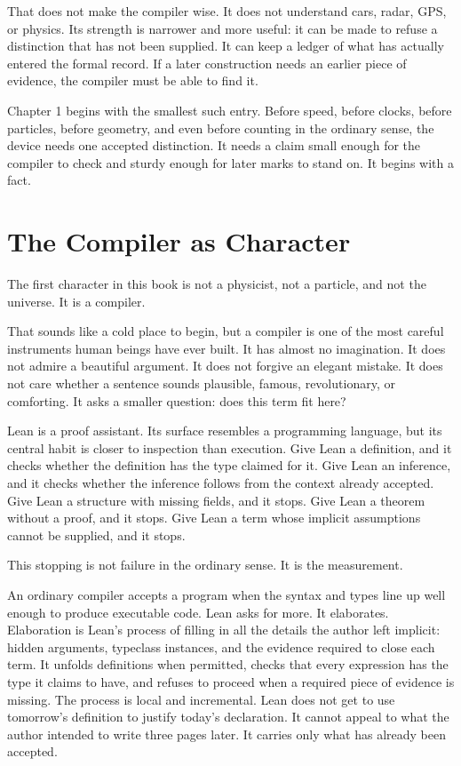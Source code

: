 That does not make the compiler wise. It does not understand cars, radar, GPS,
or physics. Its strength is narrower and more useful: it can be made to refuse
a distinction that has not been supplied. It can keep a ledger of what has
actually entered the formal record. If a later construction needs an earlier
piece of evidence, the compiler must be able to find it.

Chapter 1 begins with the smallest such entry. Before speed, before clocks,
before particles, before geometry, and even before counting in the ordinary
sense, the device needs one accepted distinction. It needs a claim small enough
for the compiler to check and sturdy enough for later marks to stand on. It
begins with a fact.


\section{The Compiler as Character}
\label{se:compiler-as-character}

The first character in this book is not a physicist, not a particle, and not
the universe. It is a compiler.

That sounds like a cold place to begin, but a compiler is one of the most
careful instruments human beings have ever built. It has almost no imagination.
It does not admire a beautiful argument. It does not forgive an elegant mistake.
It does not care whether a sentence sounds plausible, famous, revolutionary, or
comforting. It asks a smaller question: does this term fit here?

Lean is a proof assistant. Its surface resembles a programming language, but
its central habit is closer to inspection than execution. Give Lean a
definition, and it checks whether the definition has the type claimed for it.
Give Lean an inference, and it checks whether the inference follows from the
context already accepted. Give Lean a structure with missing fields, and it
stops. Give Lean a theorem without a proof, and it stops. Give Lean a term whose
implicit assumptions cannot be supplied, and it stops.

This stopping is not failure in the ordinary sense. It is the measurement.

An ordinary compiler accepts a program when the syntax and types line up well
enough to produce executable code. Lean asks for more. It elaborates.
Elaboration is Lean's process of filling in all the details the author left
implicit: hidden arguments, typeclass instances, and the evidence required to
close each term. It unfolds definitions when permitted, checks that every
expression has the type it claims to have, and refuses to proceed when a
required piece of evidence is missing. The process is local and incremental.
Lean does not get to use tomorrow's
definition to justify today's declaration. It cannot appeal to what the author
intended to write three pages later. It carries only what has already been
accepted.

